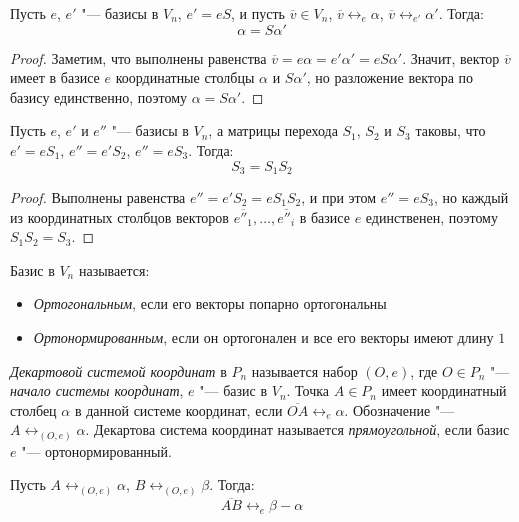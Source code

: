 \begin{theorem}
	Пусть $e$, $e'$ "--- базисы в $V_n$, $e'= eS$, и пусть $\overline{v} \in V_n$, $\overline{v} \leftrightarrow_e \alpha$, $\overline{v} \leftrightarrow_{e'} \alpha'$. Тогда:
	\[\alpha = S\alpha'\]
\end{theorem}

\begin{proof}
	Заметим, что выполнены равенства $\overline{v} = e\alpha = e'\alpha' = eS\alpha'$. Значит, вектор $\overline{v}$ имеет в базисе $e$ координатные столбцы $\alpha$ и $S\alpha'$, но разложение вектора по базису единственно, поэтому $\alpha = S\alpha'$.
\end{proof}

\begin{proposition}
	Пусть $e$, $e'$ и $e''$ "--- базисы в $V_n$, а матрицы перехода $S_1$, $S_2$ и $S_3$ таковы, что $e' = eS_1$, $e'' = e'S_2$, $e'' = eS_3$. Тогда:
	\[S_3 = S_1S_2\]
\end{proposition}

\begin{proof}
	Выполнены равенства $e'' = e'S_2 = eS_1S_2$, и при этом $e'' = eS_3$, но каждый из координатных столбцов векторов $\overline{e''_1}, \dots ,\overline{e''_i}$ в базисе $e$ единственен, поэтому $S_1S_2 = S_3$.
\end{proof}

\begin{definition}
	Базис в $V_n$ называется:
	\begin{itemize}
		\item \textit{Ортогональным}, если его векторы попарно ортогональны
		\item \textit{Ортонормированным}, если он ортогонален и все его векторы имеют длину $1$
	\end{itemize}
\end{definition}

\begin{definition}
	\textit{Декартовой системой координат} в $P_n$ называется набор $(O, e)$, где $O \in P_n$ "--- \textit{начало системы координат}, $e$ "--- базис в $V_n$. Точка $A \in P_n$ имеет координатный столбец $\alpha$ в данной системе координат, если $\overline{OA} \leftrightarrow_e \alpha$. Обозначение "--- $A \leftrightarrow_{(O, e)} \alpha$. Декартова система координат называется \textit{прямоугольной}, если базис $e$ "--- ортонормированный.
\end{definition}

\begin{proposition}
	Пусть $A \leftrightarrow_{(O, e)} \alpha$, $B \leftrightarrow_{(O, e)} \beta$.  Тогда:
	\[\overline{AB} \leftrightarrow_e \beta - \alpha\]
\end{proposition}

